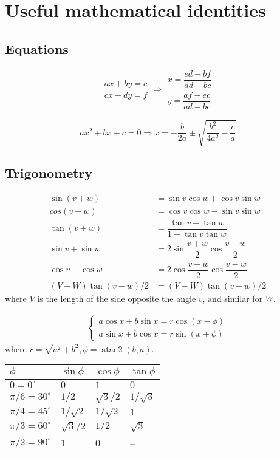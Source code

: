 
\chapter{Useful mathematical identities}

\section{Equations}
$$\begin{aligned}ax+by=c\\cx+dy=f\end{aligned}
\Rightarrow
\begin{aligned}x=\dfrac{ed-bf}{ad-bc}\\y=\dfrac{af-ec}{ad-bc}\end{aligned}$$

$$ax^2+bx+c=0 \Rightarrow x = -\frac{b}{2a}\pm\sqrt{\frac{b^2}{4a^2}-\frac{c}{a}}$$

\section{Trigonometry}
\begin{align*}
\sin(v+w)&{}=\sin v\cos w+\cos v\sin w\\
cos(v+w)&{}=\cos v\cos w-\sin v\sin w\\
\tan(v+w)&{}=\dfrac{\tan v+\tan w}{1-\tan v\tan w}\\
\sin v+\sin w&{}=2\sin\dfrac{v+w}{2}\cos\dfrac{v-w}{2}\\
\cos v+\cos w&{}=2\cos\dfrac{v+w}{2}\cos\dfrac{v-w}{2}\\
(V+W)\tan(v-w)/2&{}=(V-W)\tan(v+w)/2
\end{align*}
where $V$ is the length of the side opposite the angle $v$, and
similar for $W$.

\begin{align*}
\begin{cases}
a\cos x+b\sin x=r\cos(x-\phi)\\
a\sin x+b\cos x=r\sin(x+\phi)
\end{cases}
\end{align*}
where $r=\sqrt{a^2+b^2}, \phi=\operatorname{atan2}(b,a)$.

\begin{center}
\begin{tabular}{|l|l|l|l|}
\hline
$\phi$ & $\sin\phi$ & $\cos\phi$ & $\tan\phi$ \\
\hline
$0 = 0^\circ$ & $0$ & $1$ & $0$\\
\hline
$\pi/6 = 30^\circ$ & $1/2$ & $\sqrt3/2$ & $1/\sqrt3$\\
\hline
$\pi/4 = 45^\circ$ & $1/\sqrt2$ & $1/\sqrt2$ & $1$\\
\hline
$\pi/3 = 60^\circ$ & $\sqrt3/2$ & $1/2$ & $\sqrt3$\\
\hline
$\pi/2 = 90^\circ$ & $1$ & $0$ & --\\
\hline
\end{tabular}
\end{center}

